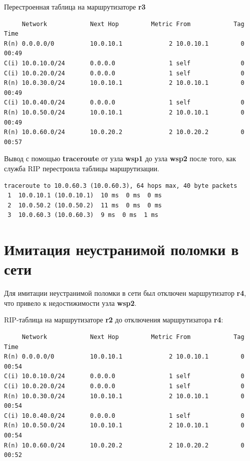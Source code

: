 \documentclass[a4paper,12pt]{article}
\begin{document}
Перестроенная таблица на маршрутизаторе \textbf{r3}

\begin{Verbatim}
     Network            Next Hop         Metric From            Tag Time
R(n) 0.0.0.0/0          10.0.10.1             2 10.0.10.1         0 00:49
C(i) 10.0.10.0/24       0.0.0.0               1 self              0
C(i) 10.0.20.0/24       0.0.0.0               1 self              0
R(n) 10.0.30.0/24       10.0.10.1             2 10.0.10.1         0 00:49
C(i) 10.0.40.0/24       0.0.0.0               1 self              0
R(n) 10.0.50.0/24       10.0.10.1             2 10.0.10.1         0 00:49
R(n) 10.0.60.0/24       10.0.20.2             2 10.0.20.2         0 00:57
\end{Verbatim}

Вывод с помощью \textbf{traceroute} от узла \textbf{wsp1} до узла \textbf{wsp2} после того, как служба RIP перестроила таблицы маршрутизации.

\begin{Verbatim}
traceroute to 10.0.60.3 (10.0.60.3), 64 hops max, 40 byte packets
 1  10.0.10.1 (10.0.10.1)  10 ms  0 ms  0 ms
 2  10.0.50.2 (10.0.50.2)  11 ms  0 ms  0 ms
 3  10.0.60.3 (10.0.60.3)  9 ms  0 ms  1 ms
\end{Verbatim}

\section{Имитация неустранимой поломки в сети}

Для имитации неустранимой поломки в сети был отключен маршрутизатор \textbf{r4}, что привело к недостижимости узла \textbf{wsp2}.

RIP-таблица на маршрутизаторе \textbf{r2} до отключения маршрутизатора \textbf{r4}:

\begin{Verbatim}
     Network            Next Hop         Metric From            Tag Time
R(n) 0.0.0.0/0          10.0.10.1             2 10.0.10.1         0 00:54
C(i) 10.0.10.0/24       0.0.0.0               1 self              0
C(i) 10.0.20.0/24       0.0.0.0               1 self              0
R(n) 10.0.30.0/24       10.0.10.1             2 10.0.10.1         0 00:54
C(i) 10.0.40.0/24       0.0.0.0               1 self              0
R(n) 10.0.50.0/24       10.0.10.1             2 10.0.10.1         0 00:54
R(n) 10.0.60.0/24       10.0.20.2             2 10.0.20.2         0 00:52
\end{Verbatim}
\end{document}
